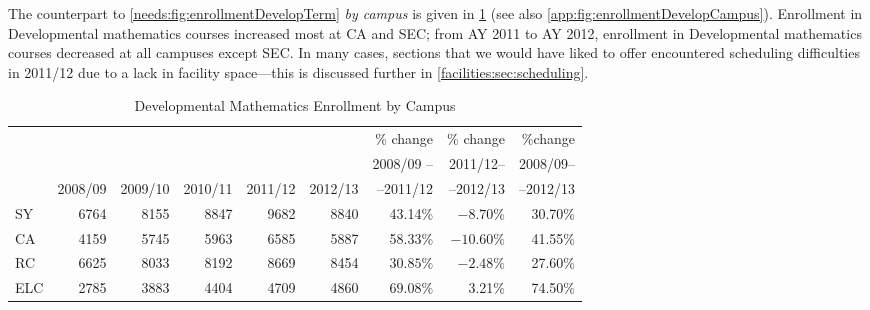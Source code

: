 The counterpart
to \cref{needs:fig:enrollmentDevelopTerm} \emph{by campus} is given in \cref{needs:tab:enrollmentDevelp}
(see also \vref{app:fig:enrollmentDevelopCampus}).
Enrollment in Developmental mathematics courses increased most
at CA and SEC; from AY 2011 to AY 2012, enrollment in Developmental mathematics courses
decreased at all campuses except SEC. In many cases,
sections that we would have liked to offer encountered scheduling difficulties in 2011/12 due to a lack 
in facility space---this is discussed further in  \vref{facilities:sec:scheduling}.

\begin{table}[!htb]
	\begin{widepage}
	\centering
	\caption{Developmental Mathematics Enrollment by Campus}
	\label{needs:tab:enrollmentDevelp}
	\begin{tabularx}{\linewidth}{X*{7}rr}
		\toprule
		    &         &         &         &         &         & \% change  & \% change  & \%change  \\
		    &         &         &         &         &         & 2008/09 -- & 2011/12--  & 2008/09-- \\
		    & 2008/09 & 2009/10 & 2010/11 & 2011/12 & 2012/13 & --2011/12  & --2012/13  & --2012/13 \\
		\midrule
		SY  & 6764    & 8155    & 8847    & 9682    & 8840    & 43.14\%    & $-8.70\%$  & 30.70\%   \\
		CA  & 4159    & 5745    & 5963    & 6585    & 5887    & 58.33\%    & $-10.60\%$ & 41.55\%   \\
		RC  & 6625    & 8033    & 8192    & 8669    & 8454    & $30.85\%$  & $-2.48\%$  & 27.60\%   \\
		ELC & 2785    & 3883    & 4404    & 4709    & 4860    & $69.08\%$  & 3.21\%     & 74.50\%   \\
		\bottomrule
	\end{tabularx}
	\end{widepage}
\end{table}

